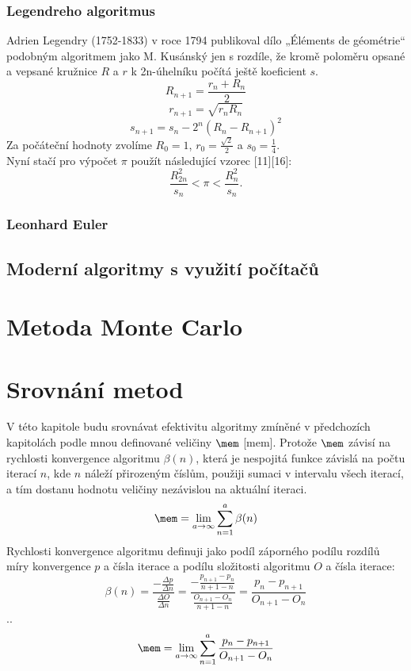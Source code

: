 \documentclass[rocnikovka]{gzwroc} %
\begin{document}
\subsubsection{Legendreho algoritmus}
Adrien Legendry (1752-1833) v roce 1794 publikoval dílo „Éléments de géométrie“ podobným algoritmem jako M. Kusánský jen s rozdíle, že kromě poloměru opsané a vepsané kružnice $R$ a $r$ k 2n-úhelníku počítá ještě koeficient $s$.
\begin{equation}
R_{n+1}=\frac{r_n+R_n}{2}
\end{equation}
\begin{equation}
r_{n+1}=\sqrt{r_nR_n}
\end{equation}
\begin{equation}
s_{n+1}=s_n-2^n(R_n-R_{n+1})^2
\end{equation}
Za počáteční hodnoty zvolíme $R_0=1$, $r_0=\frac{\sqrt{2}}{2}$ a $s_0=\frac{1}{4}$.\\
Nyní stačí pro výpočet $\pi$ použít následující vzorec [11][16]:
\begin{equation}
\frac{R_{2n}^2}{s_n}<\pi<\frac{R_n^2}{s_n}.
\end{equation}
\subsubsection{Leonhard Euler}
\subsection{Moderní algoritmy s využití počítačů}
\section{Metoda Monte Carlo}
\section{Srovnání metod}
V této kapitole budu srovnávat efektivitu algoritmy zmíněné v předchozích kapitolách podle mnou definované veličiny $\mem$ [mem]. Protože $\mem$ závisí na rychlosti konvergence algoritmu $\beta(n)$, která je nespojitá funkce závislá na počtu iterací $n$, kde $n$ náleží přirozeným číslům, použiji sumaci v intervalu všech iterací, a tím dostanu hodnotu veličiny nezávislou na aktuální iteraci.
$$
\mem=\lim_{a\to\infty} \sum_{n=1}^{a}\beta(n)
$$
Rychlosti konvergence algoritmu definuji jako podíl záporného podílu rozdílů míry konvergence $p$ a čísla iterace a  podílu složitosti algoritmu $O$ a čísla iterace:
$$
\beta(n)=\frac{-\frac{\Delta p}{\Delta n}}{\frac{\Delta O}{\Delta n}}=\frac{-\frac{p_{n+1}-p_n}{n+1-n}}{\frac{O_{n+1}-O_n}{n+1-n}}=\frac{p_n-p_{n+1}}{O_{n+1}-O_n}
$$
..
\begin{equation}
\mem=\lim_{a\to\infty} \sum_{n=1}^{a}\frac{p_n-p_{n+1}}{O_{n+1}-O_n}
\end{equation}
\end{document}

